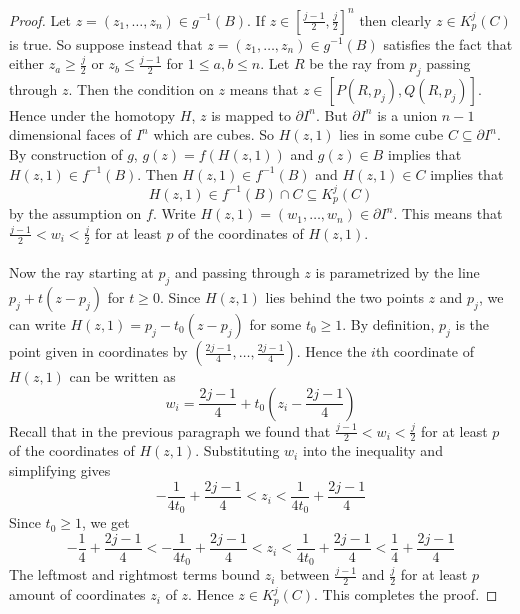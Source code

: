\documentclass[a4paper]{article}
\begin{document}
\begin{lmm}{}{}
\begin{proof}
Let $z=(z_1,\dots,z_n)\in g^{-1}(B)$. If $z\in\left[\frac{j-1}{2},\frac{j}{2}\right]^n$ then clearly $z\in K_p^j(C)$ is true. So suppose instead that $z=(z_1,\dots,z_n)\in g^{-1}(B)$ satisfies the fact that either $z_a\geq\frac{j}{2}$ or $z_b\leq\frac{j-1}{2}$ for $1\leq a,b\leq n$. Let $R$ be the ray from $p_j$ passing through $z$. Then the condition on $z$ means that $z\in[P(R,p_j),Q(R,p_j)]$. Hence under the homotopy $H$, $z$ is mapped to $\partial I^n$. But $\partial I^n$ is a union $n-1$ dimensional faces of $I^n$ which are cubes. So $H(z,1)$ lies in some cube $C\subseteq\partial I^n$. By construction of $g$, $g(z)=f(H(z,1))$ and $g(z)\in B$ implies that $H(z,1)\in f^{-1}(B)$. Then $H(z,1)\in f^{-1}(B)$ and $H(z,1)\in C$ implies that $$H(z,1)\in f^{-1}(B)\cap C\subseteq K_p^j(C)$$ by the assumption on $f$. Write $H(z,1)=(w_1,\dots,w_n)\in\partial I^n$. This means that $\frac{j-1}{2}<w_i<\frac{j}{2}$ for at least $p$ of the coordinates of $H(z,1)$. \\~\\

Now the ray starting at $p_j$ and passing through $z$ is parametrized by the line $p_j+t(z-p_j)$ for $t\geq 0$. Since $H(z,1)$ lies behind the two points $z$ and $p_j$, we can write $H(z,1)=p_j-t_0(z-p_j)$ for some $t_0\geq 1$. By definition, $p_j$ is the point given in coordinates by $\left(\frac{2j-1}{4},\dots,\frac{2j-1}{4}\right)$. Hence the $i$th coordinate of $H(z,1)$ can be written as $$w_i=\frac{2j-1}{4}+t_0\left(z_i-\frac{2j-1}{4}\right)$$ Recall that in the previous paragraph we found that $\frac{j-1}{2}<w_i<\frac{j}{2}$ for at least $p$ of the coordinates of $H(z,1)$. Substituting $w_i$ into the inequality and simplifying gives $$-\frac{1}{4t_0}+\frac{2j-1}{4}<z_i<\frac{1}{4t_0}+\frac{2j-1}{4}$$ Since $t_0\geq 1$, we get $$-\frac{1}{4}+\frac{2j-1}{4}<-\frac{1}{4t_0}+\frac{2j-1}{4}<z_i<\frac{1}{4t_0}+\frac{2j-1}{4}<\frac{1}{4}+\frac{2j-1}{4}$$ The leftmost and rightmost terms bound $z_i$ between $\frac{j-1}{2}$ and $\frac{j}{2}$ for at least $p$ amount of coordinates $z_i$ of $z$. Hence $z\in K_p^j(C)$. This completes the proof. 
\end{proof}
\end{lmm}
\end{document}
